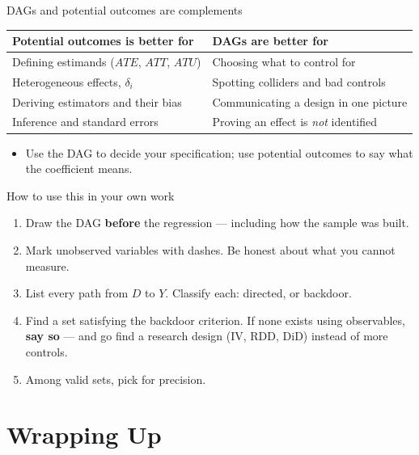 \documentclass[
  11pt,
  ignorenonframetext,
  aspectratio=169,
]{beamer}
\newcounter{none} %
\providecommand{\tightlist}{%
  \setlength{\itemsep}{0pt}\setlength{\parskip}{0pt}}
\begin{document}
\begin{frame}{DAGs and potential outcomes are complements}
\protect{}\label{dags-and-potential-outcomes-are-complements}
\begin{center}
\begin{tabular}{ll}
\toprule
Potential outcomes is better for & DAGs are better for \\
\midrule
Defining estimands ($ATE$, $ATT$, $ATU$) & Choosing what to control for \\
Heterogeneous effects, $\delta_i$        & Spotting colliders and bad controls \\
Deriving estimators and their bias       & Communicating a design in one picture \\
Inference and standard errors            & Proving an effect is \emph{not} identified \\
\bottomrule
\end{tabular}
\end{center}

\vspace{0.5em}

\begin{itemize}
\tightlist
\item
  Use the DAG to decide your specification; use potential outcomes to
  say what the coefficient means.
\end{itemize}
\end{frame}

\begin{frame}{How to use this in your own work}
\protect{}\label{how-to-use-this-in-your-own-work}
\begin{enumerate}
\tightlist
\item
  Draw the DAG \textbf{before} the regression --- including how the
  sample was built.
\item
  Mark unobserved variables with dashes. Be honest about what you cannot
  measure.
\item
  List every path from \(D\) to \(Y\). Classify each: directed, or
  backdoor.
\item
  Find a set satisfying the backdoor criterion. If none exists using
  observables, \textbf{say so} --- and go find a research design (IV,
  RDD, DiD) instead of more controls.
\item
  Among valid sets, pick for precision.
\end{enumerate}
\end{frame}

\section{Wrapping Up}\label{wrapping-up}
\end{document}
